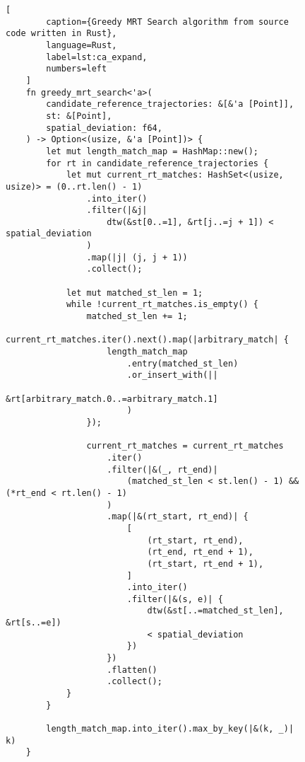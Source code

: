 \begin{figure}[t]
    \begin{lstlisting}[
        caption={Greedy MRT Search algorithm from source code written in Rust},
        language=Rust,
        label=lst:ca_expand,
        numbers=left
    ]
    fn greedy_mrt_search<'a>(
        candidate_reference_trajectories: &[&'a [Point]],
        st: &[Point],
        spatial_deviation: f64,
    ) -> Option<(usize, &'a [Point])> {
        let mut length_match_map = HashMap::new();
        for rt in candidate_reference_trajectories {
            let mut current_rt_matches: HashSet<(usize, usize)> = (0..rt.len() - 1)
                .into_iter()
                .filter(|&j|
                    dtw(&st[0..=1], &rt[j..=j + 1]) < spatial_deviation
                )
                .map(|j| (j, j + 1))
                .collect();
    
            let mut matched_st_len = 1;
            while !current_rt_matches.is_empty() {
                matched_st_len += 1;
                current_rt_matches.iter().next().map(|arbitrary_match| {
                    length_match_map
                        .entry(matched_st_len)
                        .or_insert_with(||
                            &rt[arbitrary_match.0..=arbitrary_match.1]
                        )
                });
                
                current_rt_matches = current_rt_matches
                    .iter()
                    .filter(|&(_, rt_end)|
                        (matched_st_len < st.len() - 1) && (*rt_end < rt.len() - 1)
                    )
                    .map(|&(rt_start, rt_end)| {
                        [
                            (rt_start, rt_end),
                            (rt_end, rt_end + 1),
                            (rt_start, rt_end + 1),
                        ]
                        .into_iter()
                        .filter(|&(s, e)| {
                            dtw(&st[..=matched_st_len], &rt[s..=e]) 
                            < spatial_deviation
                        })
                    })
                    .flatten()
                    .collect();
            }
        }
    
        length_match_map.into_iter().max_by_key(|&(k, _)| k)
    }
    \end{lstlisting}
\end{figure}